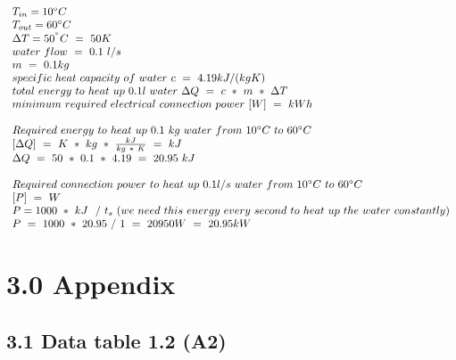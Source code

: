 \documentclass[10pt,ngerman]{scrartcl}
\begin{document}
$
\begin{array}{l}
T_{in} = 10\degree C\\
T_{out} = 60\degree C\\
\Delta T=50^{\degree } C\ =\ 50K\\
water\ flow\ =\ 0.1\ l/s\\
m\ =\ 0.1 kg\\
specific\ heat\ capacity\ of\ water\ c\ =\ 4.19kJ/( kgK)\\
total\ energy\ to\ heat\ up\ 0.1 l\ water\ \Delta Q\ =\ c\ *\ m\ *\ \Delta T\\
minimum\ required\ electrical\ connection\ power\ [ W] \ =\ kWh\\
\\
Required\ energy\ to\ heat\ up\ 0.1\ kg\ water\ from\ 10\degree C\ to\ 60\degree C\\
\left[\Delta Q\right] \ =\ K\ *\ kg\ *\ \frac{kJ}{kg\ *\ K} \ =\ kJ\\
\Delta Q\ =\ 50\ *\ 0.1\ *\ 4.19\ =\ 20.95\ kJ\\
\\
Required\ connection\ power\ to\ heat\ up\ 0.1l/s\ water\ from\ 10\degree C\ to\ 60\degree C\\
\left[ P\right] \ =\ W\\
P = 1000\ *\ kJ\ \ /\ t_{s} \ ( we\ need\ this\ energy\ every\ second\ to\ heat\ up\ the\ water\ constantly)\\
P\ =\ 1000\ *\ 20.95\ /\ 1\ =\ 20950W\ =\ 20.95kW

\end{array}
$

\newpage
\section{3.0 Appendix}
\subsection{3.1 Data table 1.2 (A2)}
\label{sec:data-table-a2}

\end{document}
